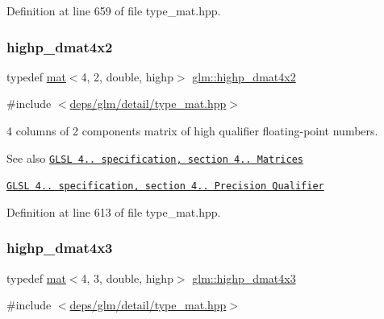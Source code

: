 Definition at line 659 of file type\+\_\+mat.\+hpp.

\mbox{\label{group__core__precision_ga22c6b4fe5bb2e33a3cfa1c026803dd68}} 
\subsubsection{\texorpdfstring{highp\+\_\+dmat4x2}{highp\_dmat4x2}}
{\footnotesize\ttfamily typedef \hyperlink{structglm_1_1mat}{mat}$<$4, 2, double, highp$>$ \hyperlink{group__core__precision_ga22c6b4fe5bb2e33a3cfa1c026803dd68}{glm\+::highp\+\_\+dmat4x2}}



{\ttfamily \#include $<$\hyperlink{type__mat_8hpp}{deps/glm/detail/type\+\_\+mat.\+hpp}$>$}

4 columns of 2 components matrix of high qualifier floating-\/point numbers.

\begin{DoxySeeAlso}{See also}
\href{http://www.opengl.org/registry/doc/GLSLangSpec.4.20.8.pdf}{\tt G\+L\+SL 4.. specification, section 4.. Matrices} 

\href{http://www.opengl.org/registry/doc/GLSLangSpec.4.20.8.pdf}{\tt G\+L\+SL 4.. specification, section 4.. Precision Qualifier} 
\end{DoxySeeAlso}


Definition at line 613 of file type\+\_\+mat.\+hpp.

\mbox{\label{group__core__precision_ga9a5dab260df6e8c46c747bac0b8d2f38}} 
\subsubsection{\texorpdfstring{highp\+\_\+dmat4x3}{highp\_dmat4x3}}
{\footnotesize\ttfamily typedef \hyperlink{structglm_1_1mat}{mat}$<$4, 3, double, highp$>$ \hyperlink{group__core__precision_ga9a5dab260df6e8c46c747bac0b8d2f38}{glm\+::highp\+\_\+dmat4x3}}



{\ttfamily \#include $<$\hyperlink{type__mat_8hpp}{deps/glm/detail/type\+\_\+mat.\+hpp}$>$}

